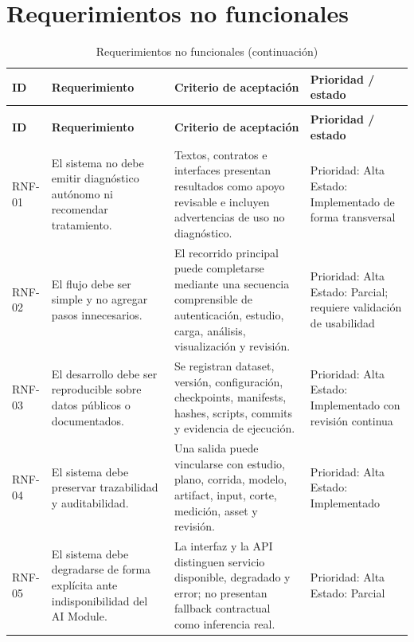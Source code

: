 \section{Requerimientos no funcionales}

{\scriptsize
\setlength{\LTleft}{0pt}
\setlength{\LTright}{0pt}
\setlength{\tabcolsep}{2pt}
\renewcommand{\arraystretch}{1.18}
\begin{longtable}{>{\raggedright\arraybackslash}p{} >{\raggedright\arraybackslash}p{} >{\raggedright\arraybackslash}p{} >{\raggedright\arraybackslash}p{}}
\caption{Requerimientos no funcionales}\label{tab:req-no-funcionales}\\
\hline
\textbf{ID} & \textbf{Requerimiento} & \textbf{Criterio de aceptación} & \textbf{Prioridad / estado} \\
\hline
\endfirsthead
\caption[]{Requerimientos no funcionales (continuación)}\\
\hline
\textbf{ID} & \textbf{Requerimiento} & \textbf{Criterio de aceptación} & \textbf{Prioridad / estado} \\
\hline
\endhead
\hline
\endfoot
RNF-01 & El sistema no debe emitir diagnóstico autónomo ni recomendar tratamiento. & Textos, contratos e interfaces presentan resultados como apoyo revisable e incluyen advertencias de uso no diagnóstico. & Prioridad: Alta Estado: Implementado de forma transversal \\
RNF-02 & El flujo debe ser simple y no agregar pasos innecesarios. & El recorrido principal puede completarse mediante una secuencia comprensible de autenticación, estudio, carga, análisis, visualización y revisión. & Prioridad: Alta Estado: Parcial; requiere validación de usabilidad \\
RNF-03 & El desarrollo debe ser reproducible sobre datos públicos o documentados. & Se registran dataset, versión, configuración, checkpoints, manifests, hashes, scripts, commits y evidencia de ejecución. & Prioridad: Alta Estado: Implementado con revisión continua \\
RNF-04 & El sistema debe preservar trazabilidad y auditabilidad. & Una salida puede vincularse con estudio, plano, corrida, modelo, artifact, input, corte, medición, asset y revisión. & Prioridad: Alta Estado: Implementado \\
RNF-05 & El sistema debe degradarse de forma explícita ante indisponibilidad del AI Module. & La interfaz y la API distinguen servicio disponible, degradado y error; no presentan fallback contractual como inferencia real. & Prioridad: Alta Estado: Parcial \\

\end{longtable}}
